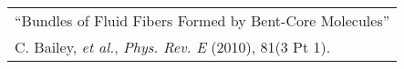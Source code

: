 \begin{tabularx}{\textwidth}{ X }
  ``Bundles of Fluid Fibers Formed by Bent-Core Molecules'' \\
  \small{C. Bailey, \textit{et al.}, \textit{Phys. Rev. E} (2010), 81(3 Pt 1).} \\
\end{tabularx}
